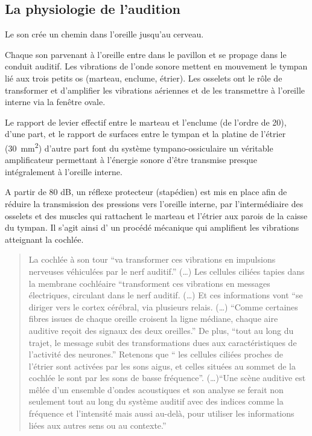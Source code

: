 \subsection{La physiologie de l'audition}

Le  son crée un chemin dans 
l'oreille\autocite[chap. 8, pp. 322--324]{marieb:biologie} jusqu'au cerveau.

Chaque son parvenant à l'oreille entre dans le pavillon et se propage
dans le conduit auditif. Les vibrations de l'onde sonore mettent en
mouvement le tympan lié aux trois petits os (marteau, enclume, étrier).
Les osselets ont le rôle de transformer et d'amplifier les vibrations
aériennes et de les transmettre à l'oreille interne via la fenêtre
ovale.

Le rapport de levier effectif entre le marteau et l'enclume
(de l'ordre de 20), d'une part, et le
rapport de surfaces entre le tympan et la platine de l'étrier
(\SI{30}{\milli\metre\squared}) d\textquoteright autre part font du système tympano-ossiculaire
un véritable amplificateur permettant à l\textquoteright énergie sonore
d\textquoteright être transmise presque intégralement à l\textquoteright oreille
interne.

A partir de 80 dB, un réflexe protecteur (stapédien) est mis en place
afin de réduire la transmission des pressions vers l\textquoteright oreille
interne, par l\textquoteright intermédiaire des osselets et des muscles
qui rattachent le marteau et l\textquoteright étrier aux parois de
la caisse du tympan. Il s'agit ainsi d' un procédé mécanique qui amplifient
les vibrations atteignant la cochlée. 
\begin{quotation}
	La cochlée à son tour ``va transformer ces vibrations en impulsions
	nerveuses véhiculées par le nerf auditif.'' (\dots) Les cellules ciliées
	tapies dans la membrane cochléaire ``transforment ces vibrations
	en messages électriques, circulant dans le nerf auditif. (\dots) Et
	ces informations vont ``se diriger vers le cortex cérébral, via plusieurs
	relais. (\dots) ``Comme certaines fibres issues de chaque oreille croisent
	la ligne médiane, chaque aire auditive reçoit des signaux des deux
	oreilles.'' De plus, ``tout au long du trajet, le message subit
	des transformations dues aux caractéristiques de l'activité des neurones.''
	Retenons que `` les cellules ciliées proches de l'étrier sont activées
	par les sons aigus, et celles situées au sommet de la cochlée le sont
	par les sons de basse fréquence''. (\dots)``Une scène auditive est
	mêlée d'un ensemble d'ondes acoustiques et son analyse se ferait non
	seulement tout au long du système auditif avec des indices comme la
	fréquence et l'intensité mais aussi au-delà, pour utiliser les informations
	liées aux autres sens ou au contexte.'' \autocite[chap.1, pp.~15--16]{bigand:cerveau}
\end{quotation}


